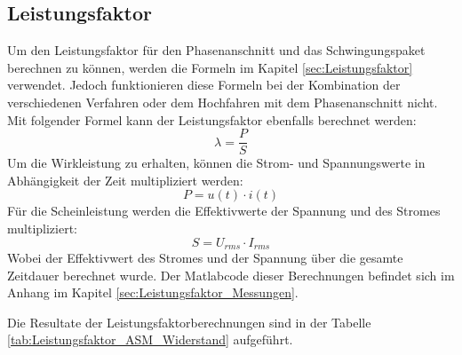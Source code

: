 \subsection{Leistungsfaktor}
Um den Leistungsfaktor für den Phasenanschnitt und das Schwingungspaket berechnen zu können, werden die Formeln im Kapitel \ref{sec:Leistungsfaktor} verwendet. Jedoch funktionieren diese Formeln bei der Kombination der verschiedenen Verfahren oder dem Hochfahren mit dem Phasenanschnitt nicht. Mit folgender Formel kann der Leistungsfaktor ebenfalls berechnet werden:
\begin{equation}
\lambda = \frac{P}{S}
\end{equation}
Um die Wirkleistung zu erhalten, können die Strom- und Spannungswerte in Abhängigkeit der Zeit  multipliziert werden:
\begin{equation}
P = u(t) \cdot i(t)
\end{equation}
Für die Scheinleistung werden die Effektivwerte der Spannung und des Stromes multipliziert:
\begin{equation}
S = U_{rms} \cdot I_{rms}
\end{equation}
Wobei der Effektivwert des Stromes und der Spannung über die gesamte Zeitdauer berechnet wurde. Der Matlabcode dieser Berechnungen befindet sich im Anhang im Kapitel \ref{sec:Leistungsfaktor_Messungen}. 


Die Resultate der Leistungsfaktorberechnungen sind in der Tabelle \ref{tab:Leistungsfaktor_ASM_Widerstand} aufgeführt.

